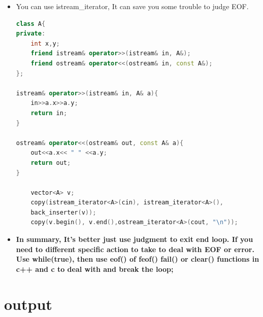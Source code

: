 \documentclass[a4paper,11pt,twoside]{book}
\begin{document}
\begin{itemize}
\begin{lstlisting}[numbers=none]
while(!issapce(cin.get()))
	continue;  //method 2
	
basic_istream& ignore(streamsize _Count = 1, \
int_type _Delim = traits_type::eof());  //method 3
cin.ignore(5, 'a');
cin.ignore(numeric_limits<streamsize>::max(), '\n');
\end{lstlisting}
	
	\item You can use istream\_iterator, It can save you some trouble to judge EOF.
	
\begin{lstlisting}[frame=single, language=c++]
class A{
private:
	int x,y;
	friend istream& operator>>(istream& in, A&);
	friend ostream& operator<<(ostream& in, const A&);
};
	
istream& operator>>(istream& in, A& a){
	in>>a.x>>a.y;
	return in;
}
	
ostream& operator<<(ostream& out, const A& a){
	out<<a.x<< " " <<a.y;
	return out;
}
	
	vector<A> v;
	copy(istream_iterator<A>(cin), istream_iterator<A>(),
	back_inserter(v));
	copy(v.begin(), v.end(),ostream_iterator<A>(cout, "\n"));
\end{lstlisting}
	
	
	\item \textbf{In summary, It's better just use judgment to exit end loop.  If you need to different specific action to take to deal with EOF or error. Use while(true), then use eof() of feof() fail() or clear() functions in c++ and c to deal with and break the loop; }
\end{itemize}

\section{output}
\end{document}
